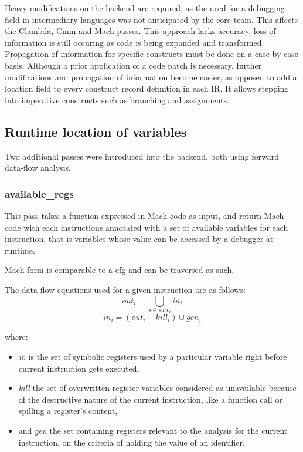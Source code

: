\begin{itemize}
\fail
Heavy modifications on the backend are required, as the need for a debugging
field in intermediary languages was not anticipated by the core team. This
affects the Clambda, Cmm and Mach passes.
\fail This approach lacks accuracy, loss of information is still occuring as code
is being expanded and transformed. Propagation of information for specific constructs
must be done on a case-by-case basis.
\tick Although a prior application of a code patch is necessary, further modifications
and propagation of information become easier, as opposed to add a location field
to every construct record definition in each IR.
\tick It allows stepping into imperative constructs such as branching and
assignments.
\end{itemize}

\subsection{Runtime location of variables}

Two additional passes were introduced into the backend, both using
forward data-flow analysis.

\clearpage
\subsubsection{available\_regs}

This pass takes a function expressed in Mach code as input, and
return Mach code with each instructions annotated
with a set of available variables for each instruction, that is variables whose
value can be accessed by a debugger at runtime.

Mach form is comparable to a \gls{cfg} and can be traversed as such.

The data-flow equations used for a given instruction are as follows:
\[
    \textit{out}_{i} = \bigcup_{s \in succ_{i}} \textit{in}_{i}
\]
\[
    \textit{in}_{i} = (\textit{out}_{i} - \textit{kill}_{i}) \cup \textit{gen}_{i}
\]

where:
\begin{itemize}
    \item \textit{in} is the set of symbolic registers used by a particular variable right before
current instruction gets executed,
    \item \textit{kill} the set of overwritten register variables considered as unavailable
because of the destructive nature of the current instruction, like a function
call or spilling a register's content,
    \item and \textit{gen} the set containing registers relevant to the
analysis for the current instruction, on the criteria of holding the value of an identifier.
\end{itemize}

